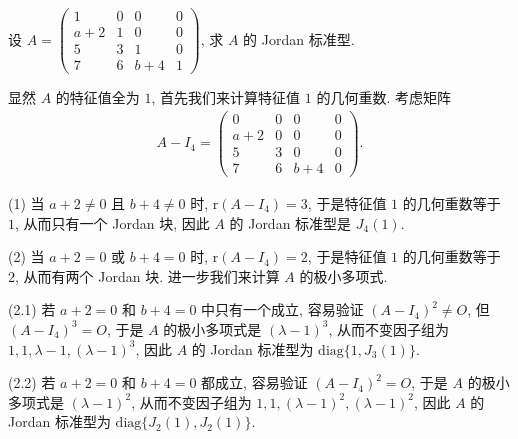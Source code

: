 \documentclass[../../main.tex]{subfiles}%
\begin{document}
\begin{example}
设 $A = \begin{pmatrix}
1 & 0 & 0 & 0 \\
a + 2 & 1 & 0 & 0 \\
5 & 3 & 1 & 0 \\
7 & 6 & b + 4 & 1
\end{pmatrix}$, 求 $A$ 的 Jordan 标准型.
\end{example}
\begin{solution}
显然 $A$ 的特征值全为 $1$, 首先我们来计算特征值 $1$ 的几何重数. 考虑矩阵
\begin{align*}
A - I_4 = \begin{pmatrix}
0 & 0 & 0 & 0 \\
a + 2 & 0 & 0 & 0 \\
5 & 3 & 0 & 0 \\
7 & 6 & b + 4 & 0
\end{pmatrix}.
\end{align*}

(1) 当 $a + 2 \neq 0$ 且 $b + 4 \neq 0$ 时, $\mathrm{r}(A - I_4) = 3$, 于是特征值 $1$ 的几何重数等于 $1$, 从而只有一个 Jordan 块, 因此 $A$ 的 Jordan 标准型是 $J_4(1)$.

(2) 当 $a + 2 = 0$ 或 $b + 4 = 0$ 时, $\mathrm{r}(A - I_4) = 2$, 于是特征值 $1$ 的几何重数等于 $2$, 从而有两个 Jordan 块. 进一步我们来计算 $A$ 的极小多项式.

(2.1) 若 $a + 2 = 0$ 和 $b + 4 = 0$ 中只有一个成立, 容易验证 $(A - I_4)^2 \neq O$, 但 $(A - I_4)^3 = O$, 于是 $A$ 的极小多项式是 $(\lambda - 1)^3$, 从而不变因子组为 $1,1,\lambda - 1,(\lambda - 1)^3$, 因此 $A$ 的 Jordan 标准型为 $\mathrm{diag}\{1,J_3(1)\}$.

(2.2) 若 $a + 2 = 0$ 和 $b + 4 = 0$ 都成立, 容易验证 $(A - I_4)^2 = O$, 于是 $A$ 的极小多项式是 $(\lambda - 1)^2$, 从而不变因子组为 $1,1,(\lambda - 1)^2,(\lambda - 1)^2$, 因此 $A$ 的 Jordan 标准型为 $\mathrm{diag}\{J_2(1),J_2(1)\}$. 

\end{solution}
\end{document}
